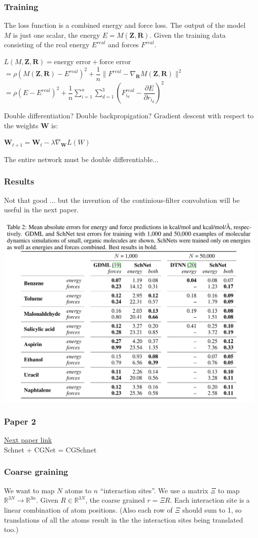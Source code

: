 \documentclass{beamer}
\begin{document}
\begin{frame}
  \frametitle{Training}
  The loss function is a combined energy and force loss. The output of the model $M$ is just one scalar, the energy $E = M(\mathbf{Z}, \mathbf{R})$. Given the training data consisting of the real energy $E^{real}$ and forces $F^{real}$.
  \begin{center}
    $L(M, \mathbf{Z}, \mathbf{R}) = \text{energy error} + \text{force error}$\\
    $= \rho(M(\mathbf{Z}, \mathbf{R}) - E^{real})^2 + \dfrac{1}{n} \| F^{real} - \nabla_{\mathbf{R}}M(\mathbf{Z}, \mathbf{R}) \|^2$\\
    $= \rho(E - E^{real})^2 + \dfrac{1}{n} \sum^n_{i=1} \sum^3_{d=1} ( F^{real}_{i_d} - \dfrac{\partial E}{\partial r_{i_d}} )^2$
  \end{center}
  \begin{block}{Double differentiation? Double backpropigation?}
    Gradient descent with respect to the weights $\mathbf{W}$ is:
    \begin{center}
      $\mathbf{W}_{t+1} = \mathbf{W}_t - \lambda \nabla_{\mathbf{W}} L(W)$
    \end{center}
    The entire network must be double differentiable...
  \end{block}
\end{frame}
\begin{frame}
  \frametitle{Results}
  Not that good ... but the invention of the continious-filter convolution will be useful in the next paper.
  \begin{center}
    \includegraphics[width=0.7\linewidth]{./paper1_results.png}
  \end{center}
\end{frame}
\begin{frame}
  \frametitle{Paper 2}
  \huge \href{https://arxiv.org/abs/2007.11412}{Next paper link}\\
  \huge Schnet + CGNet = CGSchnet
\end{frame}
\begin{frame}
  \frametitle{Coarse graining}
  We want to map $N$ atoms to $n$ ``interaction sites''.
  We use a matrix $\Xi$ to map $\mathbb{R}^{3N} \longrightarrow \mathbb{R}^{3n}$. Given $R \in \mathbb{R}^{3N}$, the coarse grained $r = \Xi R$. Each interaction site is a linear combination of atom positions. (Also each row of $\Xi$ should sum to 1, so translations of all the atoms result in the the interaction sites being translated too.)
\end{frame}
\end{document}
